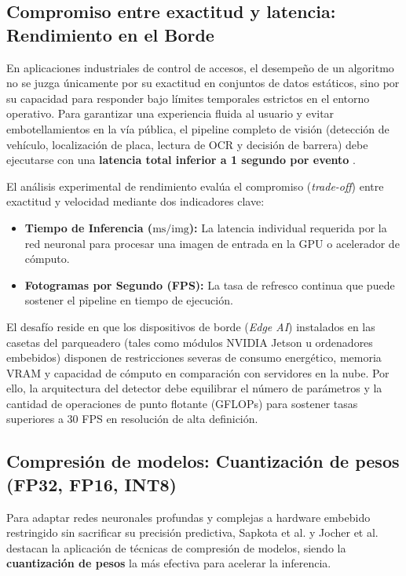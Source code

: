\subsection{Compromiso entre exactitud y latencia: Rendimiento en el Borde}

En aplicaciones industriales de control de accesos, el desempeño de un algoritmo
no se juzga únicamente por su exactitud en conjuntos de datos estáticos, sino por
su capacidad para responder bajo límites temporales estrictos en el entorno
operativo. Para garantizar una experiencia fluida al usuario y evitar
embotellamientos en la vía pública, el pipeline completo de visión (detección de
vehículo, localización de placa, lectura de OCR y decisión de barrera) debe
ejecutarse con una \textbf{latencia total inferior a 1 segundo por evento}
\cite{auzabanegas2026blpr}.

El análisis experimental de rendimiento evalúa el compromiso (\textit{trade-off})
entre exactitud y velocidad mediante dos indicadores clave:
\begin{itemize}
    \item \textbf{Tiempo de Inferencia ($\text{ms/img}$):} La latencia individual
        requerida por la red neuronal para procesar una imagen de entrada en la
        GPU o acelerador de cómputo.

    \item \textbf{Fotogramas por Segundo (FPS):} La tasa de refresco continua que
        puede sostener el pipeline en tiempo de ejecución.
\end{itemize}

El desafío reside en que los dispositivos de borde (\textit{Edge AI}) instalados
en las casetas del parqueadero (tales como módulos NVIDIA Jetson u ordenadores
embebidos) disponen de restricciones severas de consumo energético, memoria VRAM
y capacidad de cómputo en comparación con servidores en la nube. Por ello, la
arquitectura del detector debe equilibrar el número de parámetros y la cantidad
de operaciones de punto flotante (GFLOPs) para sostener tasas superiores a 30 FPS
en resolución de alta definición.

\subsection{Compresión de modelos: Cuantización de pesos (FP32, FP16, INT8)}

Para adaptar redes neuronales profundas y complejas a hardware embebido
restringido sin sacrificar su precisión predictiva, Sapkota et al.
\cite{sapkota2026yolo26} y Jocher et al. \cite{jocher2026yolo26} destacan la
aplicación de técnicas de compresión de modelos, siendo la \textbf{cuantización
de pesos} la más efectiva para acelerar la inferencia.

